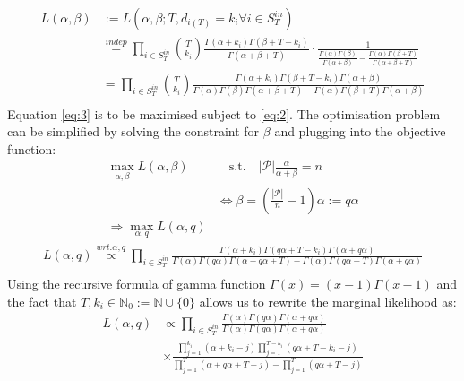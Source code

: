 \documentclass[a4paper, 12pt]{article}
\begin{document}
\begin{itemize}
\begin{align}
        L(\alpha, \beta) &:= L(\alpha, \beta; T, d_{i(T)} = k_i \forall i \in S_T^{in}) \nonumber \\
        &\overset{indep}{=} \prod_{i \in S_T^{in}} \binom{T}{k_i} \frac{\Gamma(\alpha + k_i)\Gamma(\beta + T - k_i)}{\Gamma(\alpha + \beta + T)} \cdot \frac{1}{\frac{\Gamma(\alpha)\Gamma(\beta)}{\Gamma(\alpha + \beta)} - \frac{\Gamma(\alpha)\Gamma(\beta + T)}{\Gamma(\alpha + \beta + T)}} \nonumber \\
        &= \prod_{i \in S_T^{in}} \binom{T}{k_i} \frac{\Gamma(\alpha + k_i)\Gamma(\beta + T - k_i)\Gamma(\alpha + \beta)}{\Gamma(\alpha)\Gamma(\beta)\Gamma(\alpha + \beta + T) - \Gamma(\alpha)\Gamma(\beta + T)\Gamma(\alpha + \beta)} \nonumber \\
    \end{align}
    Equation \eqref{eq:3} is to be maximised subject to \eqref{eq:2}. The optimisation problem can be simplified by solving the constraint for $\beta$ and plugging into the objective function:
    \begin{align*}
        \max_{\alpha, \beta} L(\alpha, \beta) &\quad \text{s.t.} \quad |\mathcal{P}|\frac{\alpha}{\alpha + \beta} = n \\
        &\Leftrightarrow \beta = \left(\frac{|\mathcal{P}|}{n} - 1 \right)\alpha := q\alpha\\
        \Rightarrow \max_{\alpha, q} L(\alpha, q) &
    \end{align*}
    \begin{align*}
        L(\alpha, q) \overset{wrt. \alpha, q}{\propto} \prod_{i \in S_T^{in}} \frac{\Gamma(\alpha + k_i)\Gamma(q\alpha + T - k_i)\Gamma(\alpha + q\alpha)}{\Gamma(\alpha)\Gamma(q\alpha)\Gamma(\alpha + q\alpha + T) - \Gamma(\alpha)\Gamma(q\alpha + T)\Gamma(\alpha + q\alpha)} \nonumber \\
    \end{align*}
    Using the recursive formula of gamma function $\Gamma(x) = (x - 1)\Gamma(x - 1)$ and the fact that $T, k_i \in \mathbb{N}_0 := \mathbb{N} \cup \{0\}$ allows us to rewrite the marginal likelihood as:
    \begin{align*}
        L(\alpha, q) &\propto \prod_{i \in S_T^{in}} \frac{\Gamma(\alpha) \Gamma(q\alpha) \Gamma(\alpha + q\alpha)}{\Gamma(\alpha)\Gamma(q\alpha)\Gamma(\alpha + q\alpha)}\\
        &\times \frac{\prod_{j=1}^{k_i} (\alpha + k_i - j)\prod_{j=1}^{T - k_i} (q\alpha + T - k_i - j)}{\prod_{j=1}^T(\alpha + q\alpha + T - j) - \prod_{j=1}^T (q\alpha + T - j)} \\

\end{align*}
\end{itemize}
\end{document}

